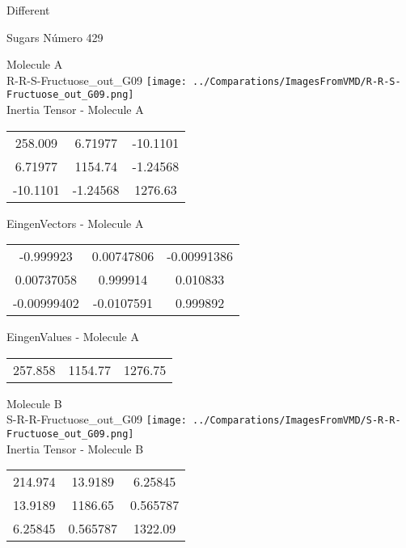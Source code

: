 \begin{center}
\vtab
\vtab
\textcolor{NavyBlue}{\Large Different}
\end{center}

 \newpage

\vtab[-2cm]
\begin{center}
{\large Sugars \tab Número 429}
\end{center}
\begin{multicols}{2}
\begin{center}

Molecule A \\ 
R-R-S-Fructuose\_out\_G09
\texttt{[image: ../Comparations/ImagesFromVMD/R-R-S-Fructuose\_out\_G09.png]}
\\
Inertia Tensor - Molecule A \\
\vtab

\begin{tabular}{|c c c|}
258.009	 & 	6.71977	 & 	-10.1101	 \\
6.71977	 & 	1154.74	 & 	-1.24568	 \\
-10.1101	 & 	-1.24568	 & 	1276.63
\end{tabular}

\vtab
 EingenVectors - Molecule A     \\
\vtab
\begin{tabular}{|c c c|}
-0.999923	 & 	0.00747806	 & 	-0.00991386	 \\
0.00737058	 & 	0.999914	 & 	0.010833	 \\
-0.00999402	 & 	-0.0107591	 & 	0.999892
\end{tabular}

\vtab
 EingenValues - Molecule A     \\
\vtab
\begin{tabular}{|c c c|}
257.858	 & 	1154.77	 & 	1276.75	 \\
\end{tabular}
\columnbreak

Molecule B \\ 
S-R-R-Fructuose\_out\_G09
\texttt{[image: ../Comparations/ImagesFromVMD/S-R-R-Fructuose\_out\_G09.png]}
\\
Inertia Tensor - Molecule B \\
\vtab

\begin{tabular}{|c c c|}
214.974	 & 	13.9189	 & 	6.25845	 \\
13.9189	 & 	1186.65	 & 	0.565787	 \\
6.25845	 & 	0.565787	 & 	1322.09
\end{tabular}


\end{center}
\end{multicols}

